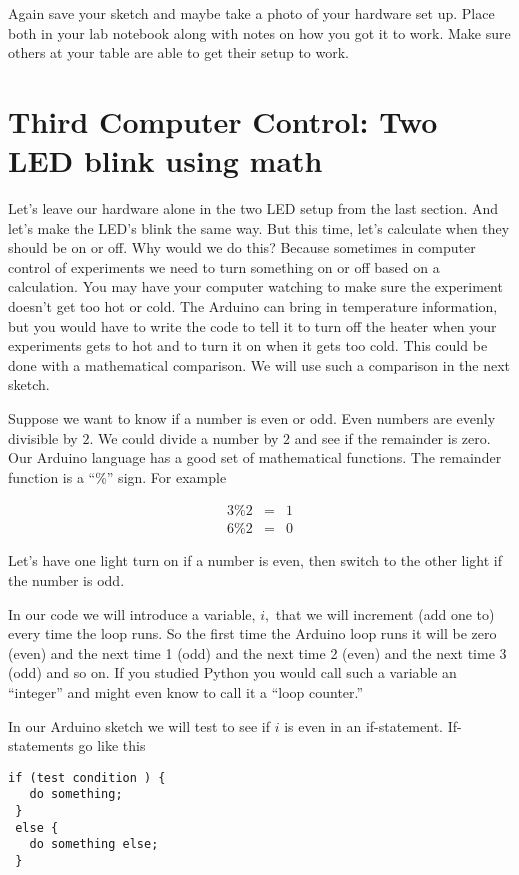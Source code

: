 Again save your sketch and maybe take a photo of your hardware set up. Place both in your lab notebook along with notes on how you got it to work. Make sure others at your table are able to get their setup to work. 

\section{Third Computer Control: Two LED blink using math}

Let's leave our hardware alone in the two LED setup from the last section. And let's make the LED's blink the same way. But this time, let's calculate when they should be on or off. Why would we do this? Because sometimes in computer control of experiments we need to turn something on or off based on a calculation. You may have your computer watching to make sure the experiment doesn't get too hot or cold. The Arduino can bring in temperature information, but you would have to write the code to tell it to turn off the heater when your experiments gets to hot and to turn it on when it gets too cold. This could be done with a mathematical comparison. We will use such a comparison in the next sketch.

Suppose we want to know if a number is even or odd. Even numbers are evenly divisible by $2.$ We could divide a number by $2$ and see if the remainder is zero. Our Arduino language has a good set of mathematical functions. The remainder function is a ``\%'' sign. For example 

\begin{eqnarray*}
	3\%2 &=&1 \\
	6\%2 &=&0
\end{eqnarray*}

Let's have one light turn on if a number is even, then switch to the other light if the number is odd.

In our code we will introduce a variable, $i,$ that we will increment (add one to) every time the loop runs. So the first time the Arduino loop runs it will be zero (even) and the next time 1 (odd) and the next time 2 (even) and the next time 3 (odd) and so on. If you studied Python you would call such a variable an ``integer'' and might even know to call it a ``loop counter.'' 

In our Arduino sketch we will test to see if $i$ is even in an if-statement. If-statements go like this 

\begin{lstlisting}[language=Arduino]
 if (test condition ) {
   do something;
 }
 else {
   do something else;
 }
\end{lstlisting}

